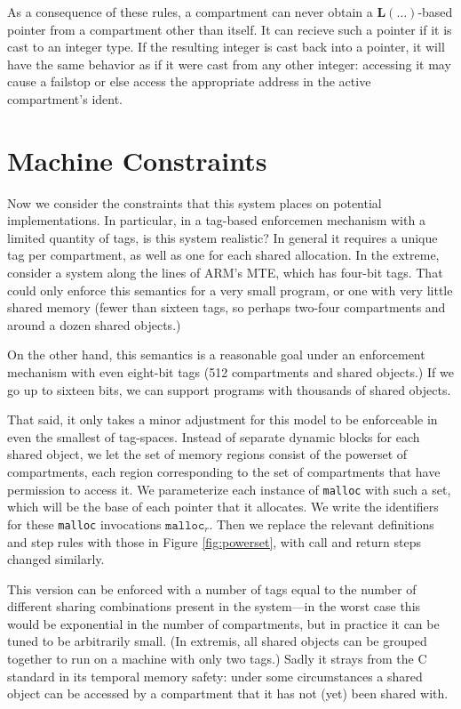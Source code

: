 \documentclass{article}
\begin{document}
As a consequence of these rules, a compartment can never obtain a
\(\mathbf{L}(\dots)\)-based pointer from a compartment other than itself.
It can recieve such a pointer if it is cast to an integer type. If the resulting
integer is cast back into a pointer, it will have the same behavior as if it were cast
from any other integer: accessing it may cause a failstop or else access the
appropriate address in the active compartment's ident.

\section{Machine Constraints}

Now we consider the constraints that this system places on potential implementations.
In particular, in a tag-based enforcemen mechanism with a limited quantity of tags,
is this system realistic? In general it requires a unique tag per compartment,
as well as one for each shared allocation. In the extreme, consider a system along
the lines of ARM's MTE, which has four-bit tags. That could only enforce this
semantics for a very small program, or one with very little shared memory
(fewer than sixteen tags, so perhaps two-four compartments and around a dozen shared objects.)

On the other hand, this semantics is a reasonable goal under an enforcement mechanism
with even eight-bit tags (512 compartments and shared objects.) If we go up to sixteen
bits, we can support programs with thousands of shared objects.

That said, it only takes a minor adjustment for this model to be enforceable in even
the smallest of tag-spaces. Instead of separate dynamic blocks for each shared
object, we let the set of memory regions consist of the powerset of compartments,
each region corresponding to the set of compartments that have permission to access it.
We parameterize each instance of {\tt malloc}
with such a set, which will be the base of each pointer that it allocates. We write
the identifiers for these {\tt malloc} invocations \(\mathtt{malloc}_r\).
Then we replace the relevant definitions and step rules with those in
Figure \ref{fig:powerset}, with call and return steps changed similarly.

This version can be enforced with a number of tags equal to the number of different
sharing combinations present in the system---in the worst case this would be
exponential in the number of compartments, but in practice it can be tuned to be
arbitrarily small. (In extremis, all shared objects can be grouped together to run
on a machine with only two tags.) Sadly it strays from the C standard in its
temporal memory safety: under some circumstances a shared object can be accessed
by a compartment that it has not (yet) been shared with.
\end{document}
